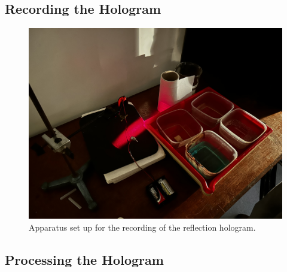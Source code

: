 \documentclass[12pt]{article}
\begin{document}
\subsection{Recording the Hologram}

\begin{figure}[H]
    \centering
    \includegraphics[width=.5\linewidth]{holo setup.jpeg}
    \caption{\centering Apparatus set up for the recording of the reflection hologram.}
    \label{fig:11}
\end{figure}

\subsection{Processing the Hologram}
\end{document}
